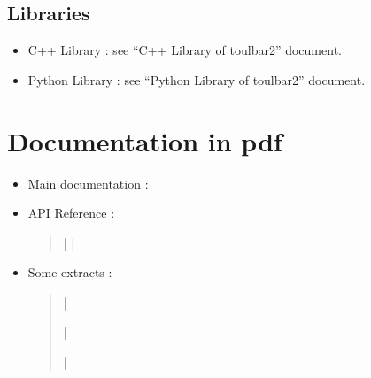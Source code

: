 \documentclass[letterpaper,10pt,openany,oneside,english]{sphinxmanual}
\begin{document}
\sphinxstepscope


\section{Libraries}
\label{\detokenize{ref/ref_lib:libraries}}\label{\detokenize{ref/ref_lib:ref-lib}}\label{\detokenize{ref/ref_lib::doc}}\begin{itemize}
\item {} 
\sphinxAtStartPar
C++ Library : see “C++ Library of toulbar2” document.

\item {} 
\sphinxAtStartPar
Python Library : see “Python Library of toulbar2” document.

\end{itemize}

\sphinxstepscope


\chapter{Documentation in pdf}
\label{\detokenize{pdfmanuals:documentation-in-pdf}}\label{\detokenize{pdfmanuals:pdf-manuals}}\label{\detokenize{pdfmanuals::doc}}\begin{itemize}
\item {} 
\sphinxAtStartPar
Main documentation :
\begin{quote}

\sphinxAtStartPar
{}
\end{quote}

\item {} 
\sphinxAtStartPar
API Reference :
\begin{quote}

\sphinxAtStartPar
{} |
 |
\end{quote}

\item {} 
\sphinxAtStartPar
Some extracts :
\begin{quote}

\sphinxAtStartPar
{} |

\sphinxAtStartPar
{} |

\sphinxAtStartPar
{} |
\end{quote}

\end{itemize}
\end{document}
